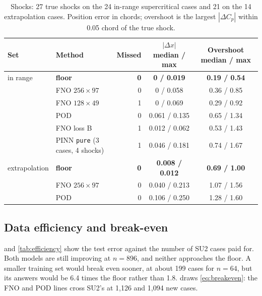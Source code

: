 \documentclass[11pt]{article}
\newcommand{\Cp}{C_p}
\begin{document}
\begin{table}[t]
\centering\small
\caption{Shocks: 27 true shocks on the 24 in-range supercritical cases and 21 on the 14
extrapolation cases. Position error in chords; overshoot is the largest $|\Delta\Cp|$ within 0.05
chord of the true shock.}
\label{tab:shocks}
\begin{tabular}{@{}llrcc@{}}
\toprule
Set & Method & Missed & $|\Delta x|$ median / max & Overshoot median / max\\
\midrule
in range & \textbf{floor} & \textbf{0} & \textbf{0 / 0.019} & \textbf{0.19 / 0.54}\\
 & FNO $256\times97$ & 0 & 0 / 0.058 & 0.36 / 0.85\\
 & FNO $128\times49$ & 1 & 0 / 0.069 & 0.29 / 0.92\\
 & POD & 0 & 0.061 / 0.135 & 0.65 / 1.34\\
 & FNO loss B & 1 & 0.012 / 0.062 & 0.53 / 1.43\\
 & PINN \texttt{pure} (3 cases, 4 shocks) & 1 & 0.046 / 0.181 & 0.74 / 1.67\\
\midrule
extrapolation & \textbf{floor} & \textbf{0} & \textbf{0.008 / 0.012} & \textbf{0.69 / 1.00}\\
 & FNO $256\times97$ & 0 & 0.040 / 0.213 & 1.07 / 1.56\\
 & POD & 0 & 0.106 / 0.250 & 1.28 / 1.60\\
\bottomrule
\end{tabular}
\end{table}

\subsection{Data efficiency and break-even}

 and \cref{tab:efficiency} show the test error against the number of SU2 cases
paid for. Both models are still improving at $n = 896$, and neither approaches the floor. A smaller
training set would break even sooner, at about 199 cases for $n = 64$, but its answers would be 6.4
times the floor rather than 1.8.  draws \cref{eq:breakeven}: the FNO and POD
lines cross SU2's at 1,126 and 1,094 new cases.
\end{document}
